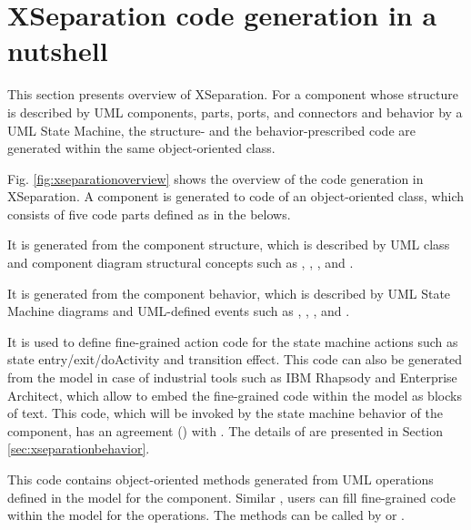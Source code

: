 \section{XSeparation code generation in a nutshell}
\label{sec:butshell}

This section presents overview of XSeparation.
For a component whose structure is described by UML components, parts, ports, and connectors and behavior by a UML State Machine, the structure- and the behavior-prescribed code are generated within the same object-oriented class. 

Fig. \ref{fig:xseparationoverview} shows the overview of the code generation in XSeparation.
A component  is generated to code of an object-oriented class, which consists of five code parts defined as in the belows.

\noindent
{} It is generated from the component structure, which is described by UML class and component diagram structural concepts such as , , , and .

\noindent	
{} It is generated from the component behavior, which is described by UML State Machine diagrams and UML-defined events such as , , , and .

\noindent	
{} It is used to define fine-grained action code for the state machine actions such as state entry/exit/doActivity and transition effect.
This code can also be generated from the model in case of industrial tools such as IBM Rhapsody and Enterprise Architect, which allow to embed the fine-grained code within the model as blocks of text.
This code, which will be invoked by the state machine behavior of the component, has an agreement () with .
The details of  are presented in Section \ref{sec:xseparationbehavior}. 

\noindent	
{} This code contains object-oriented methods generated from UML operations defined in the model for the component.
Similar , users can fill fine-grained code within the model for the operations.
The methods can be called by  or .

